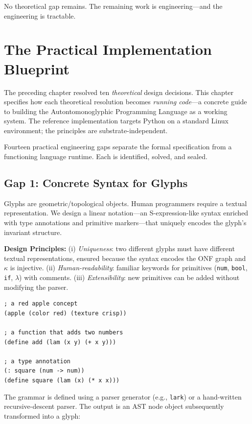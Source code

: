 \documentclass[12pt, letterpaper]{book}
\begin{document}
No theoretical gap remains. The remaining work is engineering---and the engineering is tractable.


\chapter{The Practical Implementation Blueprint}

The preceding chapter resolved ten \textit{theoretical} design decisions. This chapter specifies how each theoretical resolution becomes \textit{running code}---a concrete guide to building the Autontomonoglyphic Programming Language as a working system. The reference implementation targets Python on a standard Linux environment; the principles are substrate-independent.

Fourteen practical engineering gaps separate the formal specification from a functioning language runtime. Each is identified, solved, and sealed.

\section{Gap 1: Concrete Syntax for Glyphs}

Glyphs are geometric/topological objects. Human programmers require a textual representation. We design a linear notation---an S-expression-like syntax enriched with type annotations and primitive markers---that uniquely encodes the glyph's invariant structure.

\textbf{Design Principles:} (i) \textit{Uniqueness}: two different glyphs must have different textual representations, ensured because the syntax encodes the ONF graph and $\kappa$ is injective. (ii) \textit{Human-readability}: familiar keywords for primitives (\texttt{num}, \texttt{bool}, \texttt{if}, \texttt{$\lambda$}) with comments. (iii) \textit{Extensibility}: new primitives can be added without modifying the parser.

\begin{verbatim}
; a red apple concept
(apple (color red) (texture crisp))

; a function that adds two numbers
(define add (lam (x y) (+ x y)))

; a type annotation
(: square (num -> num))
(define square (lam (x) (* x x)))
\end{verbatim}

The grammar is defined using a parser generator (e.g., \texttt{lark}) or a hand-written recursive-descent parser. The output is an AST node object subsequently transformed into a glyph:
\end{document}
